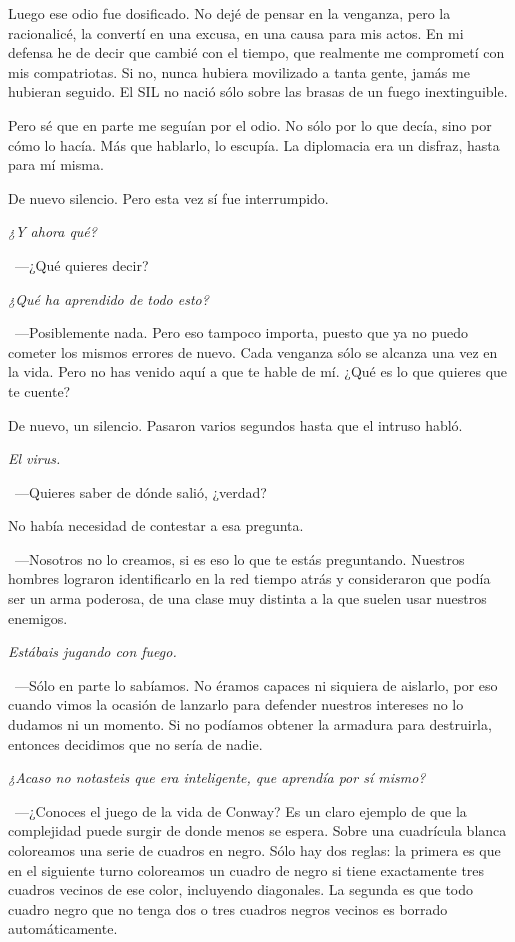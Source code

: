 \rquoti Luego ese odio fue dosificado. No dejé de pensar en la venganza, pero la racionalicé, la convertí en una excusa, en una causa para mis actos. En mi defensa he de decir que cambié con el tiempo, que realmente me comprometí con mis compatriotas. Si no, nunca hubiera movilizado a tanta gente, jamás me hubieran seguido. El SIL no nació sólo sobre las brasas de un fuego inextinguible.

\rquoti Pero sé que en parte me seguían por el odio. No sólo por lo que decía, sino por cómo lo hacía. Más que hablarlo, lo escupía. La diplomacia era un disfraz, hasta para mí misma.

De nuevo silencio. Pero esta vez sí fue interrumpido.

\emph{¿Y ahora qué?}

~---¿Qué quieres decir?

\emph{¿Qué ha aprendido de todo esto?}

~---Posiblemente nada. Pero eso tampoco importa, puesto que ya no puedo cometer los mismos errores de nuevo. Cada venganza sólo se alcanza una vez en la vida. Pero no has venido aquí a que te hable de mí. ¿Qué es lo que quieres que te cuente?

De nuevo, un silencio. Pasaron varios segundos hasta que el intruso habló.

\emph{El virus.}

~---Quieres saber de dónde salió, ¿verdad?

No había necesidad de contestar a esa pregunta.

~---Nosotros no lo creamos, si es eso lo que te estás preguntando. Nuestros hombres lograron identificarlo en la red tiempo atrás y consideraron que podía ser un arma poderosa, de una clase muy distinta a la que suelen usar nuestros enemigos.

\emph{Estábais jugando con fuego.}

~---Sólo en parte lo sabíamos. No éramos capaces ni siquiera de aislarlo, por eso cuando vimos la ocasión de lanzarlo para defender nuestros intereses no lo dudamos ni un momento. Si no podíamos obtener la armadura para destruirla, entonces decidimos que no sería de nadie.

\emph{¿Acaso no notasteis que era inteligente, que aprendía por sí mismo?}

~---¿Conoces el juego de la vida de Conway? Es un claro ejemplo de que la complejidad puede surgir de donde menos se espera. Sobre una cuadrícula blanca coloreamos una serie de cuadros en negro. Sólo hay dos reglas: la primera es que en el siguiente turno coloreamos un cuadro de negro si tiene exactamente tres cuadros vecinos de ese color, incluyendo diagonales. La segunda es que todo cuadro negro que no tenga dos o tres cuadros negros vecinos es borrado automáticamente.

